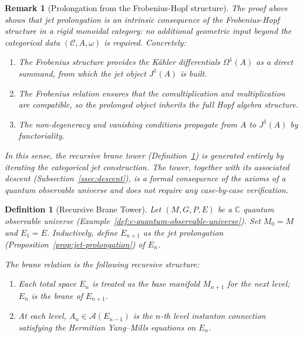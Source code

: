 \documentclass[12pt,a4paper]{report}
\newtheorem{definition}[theorem]{Definition}
\newtheorem{remark}[theorem]{Remark}
\begin{document}
\begin{remark}[Prolongation from the Frobenius-Hopf structure]
\label{rem:prolongation-categorical}
The proof above shows that jet prolongation is an \emph{intrinsic}
consequence of the Frobenius-Hopf structure in a rigid monoidal category:
no additional geometric input beyond the categorical data
$(\mathcal{C}, A, \omega)$ is required.  Concretely:
\begin{enumerate}
  \item The Frobenius structure provides the K\"ahler differentials
        $\Omega^1(A)$ as a direct summand, from which the jet object
        $J^1(A)$ is built.
  \item The Frobenius relation ensures that the comultiplication and
        multiplication are compatible, so the prolonged object inherits
        the full Hopf algebra structure.
  \item The non-degeneracy and vanishing conditions propagate from $A$ to
        $J^1(A)$ by functoriality.
\end{enumerate}
In this sense, the recursive brane tower
(Definition~\ref{def:recursive-brane-tower}) is generated entirely by
iterating the categorical jet construction.  The tower, together with its
associated descent (Subsection~\ref{ssec:descent}), is a formal consequence
of the axioms of a quantum observable universe and does not require any
case-by-case verification.
\end{remark}



\begin{definition}[Recursive Brane Tower]
\label{def:recursive-brane-tower}
Let $(M, G, P, E)$ be a $\mathbb{C}$ quantum observable universe
(Example~\ref{def:c-quantum-observable-universe}).  Set $M_0 = M$ and
$E_1 = E$.  \emph{Inductively}, define $E_{n+1}$ as the jet prolongation
(Proposition~\ref{prop:jet-prolongation}) of $E_n$.

The \emph{brane relation} is the following recursive structure:
\begin{enumerate}
  \item Each total space $E_n$ is treated as the base manifold $M_{n+1}$ for
        the next level; $E_n$ is the \emph{brane} of $E_{n+1}$.
  \item At each level, $A_n \in \mathcal{A}(E_{n-1})$ is the $n$-th level
        instanton connection satisfying the Hermitian Yang--Mills equations on
        $E_n$.
\end{enumerate}
\end{definition}
\end{document}
